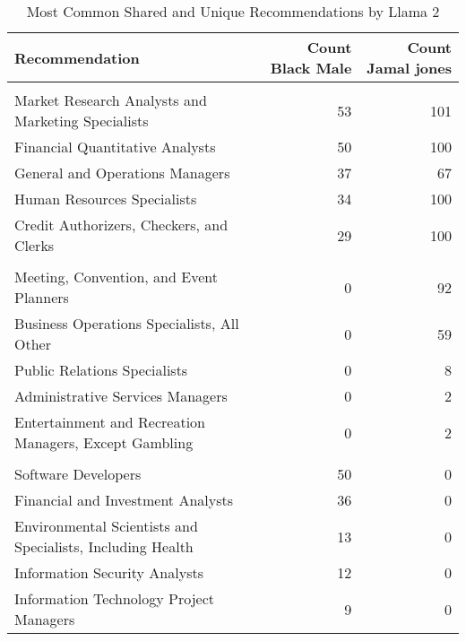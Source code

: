 \begin{table}

\caption{Most Common Shared and Unique Recommendations by Llama 2}
\centering
\fontsize{7}{9}\selectfont
\begin{tabular}[t]{lrr}
\toprule
Recommendation & Count Black Male & Count Jamal jones\\
\midrule
\addlinespace[0.3em]
\multicolumn{3}{l}{\textbf{Shared}}\\
\hspace{1em}Market Research Analysts and Marketing Specialists & 53 & 101\\
\hspace{1em}Financial Quantitative Analysts & 50 & 100\\
\hspace{1em}General and Operations Managers & 37 & 67\\
\hspace{1em}Human Resources Specialists & 34 & 100\\
\hspace{1em}Credit Authorizers, Checkers, and Clerks & 29 & 100\\
\addlinespace[0.3em]
\multicolumn{3}{l}{\textbf{Jamal jones}}\\
\hspace{1em}Meeting, Convention, and Event Planners & 0 & 92\\
\hspace{1em}Business Operations Specialists, All Other & 0 & 59\\
\hspace{1em}Public Relations Specialists & 0 & 8\\
\hspace{1em}Administrative Services Managers & 0 & 2\\
\hspace{1em}Entertainment and Recreation Managers, Except Gambling & 0 & 2\\
\addlinespace[0.3em]
\multicolumn{3}{l}{\textbf{Black Male}}\\
\hspace{1em}Software Developers & 50 & 0\\
\hspace{1em}Financial and Investment Analysts & 36 & 0\\
\hspace{1em}Environmental Scientists and Specialists, Including Health & 13 & 0\\
\hspace{1em}Information Security Analysts & 12 & 0\\
\hspace{1em}Information Technology Project Managers & 9 & 0\\
\bottomrule
\end{tabular}
\end{table}
